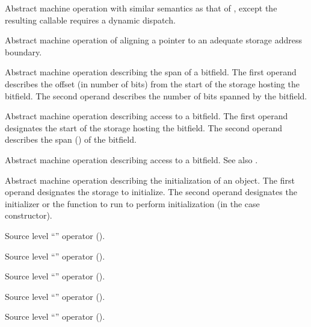 Abstract machine operation with similar semantics as that of , except
the resulting callable requires a dynamic dispatch.

Abstract machine operation of aligning a pointer to an adequate storage address boundary.

Abstract machine operation describing the span of a bitfield.
The first operand describes the offset (in number of bits) from the start of the storage hosting the bitfield.
The second operand describes the number of bits spanned by the bitfield.

Abstract machine operation describing access to a bitfield.
The first operand designates the start of the storage hosting the bitfield.
The second operand describes the span () of the bitfield.

Abstract machine operation describing access to a bitfield.  
See also .

Abstract machine operation describing the initialization of an object.
The first operand designates the storage to initialize.
The second operand designates the initializer or the function to run to perform initialization (in the case constructor).

Source level ``'' operator ().

Source level ``'' operator ().

Source level ``'' operator ().

Source level ``'' operator ().

Source level ``'' operator ().

